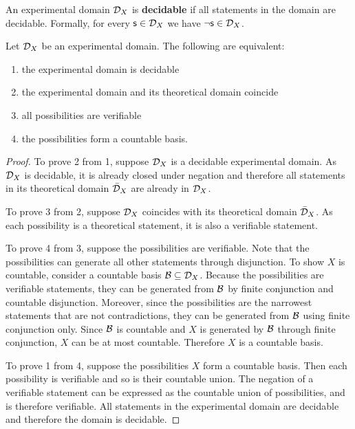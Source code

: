 \documentclass[11pt,letterpaper,fleqn]{memoir} %
\begin{document}
\begin{mathSection}
\begin{defn}
	An experimental domain $\mathcal{D}_X$ is \textbf{decidable} if all statements in the domain are decidable. Formally, for every $\mathsf{s} \in \mathcal{D}_X$ we have $\neg\mathsf{s} \in \mathcal{D}_X$.
\end{defn}

\begin{prop}\label{1_prop_decidable_domain_properties}
	Let $\mathcal{D}_X$ be an experimental domain. The following are equivalent:
	\begin{enumerate}
		\item the experimental domain is decidable
		\item the experimental domain and its theoretical domain coincide
		\item all possibilities are verifiable
		\item the possibilities form a countable basis.
	\end{enumerate}
\end{prop}

\begin{proof}
	To prove 2 from 1, suppose $\mathcal{D}_X$ is a decidable experimental domain. As $\mathcal{D}_X$ is decidable, it is already closed under negation and therefore all statements in its theoretical domain $\bar{\mathcal{D}}_X$ are already in $\mathcal{D}_X$.
	
	To prove 3 from 2, suppose $\mathcal{D}_X$ coincides with its theoretical domain $\bar{\mathcal{D}}_X$. As each possibility is a theoretical statement, it is also a verifiable statement.
	
	To prove 4 from 3, suppose the possibilities are verifiable. Note that the possibilities can generate all other statements through disjunction. To show $X$ is countable, consider a countable basis $\mathcal{B} \subseteq \mathcal{D}_X$. Because the possibilities are verifiable statements, they can be generated from $\mathcal{B}$ by finite conjunction and countable disjunction. Moreover, since the possibilities are the narrowest statements that are not contradictions, they can be generated from $\mathcal{B}$ using finite conjunction only. Since $\mathcal{B}$ is countable and $X$ is generated by $\mathcal{B}$ through finite conjunction, $X$ can be at most countable. Therefore $X$ is a countable basis.
	
	To prove 1 from 4, suppose the possibilities $X$ form a countable basis. Then each possibility is verifiable and so is their countable union. The negation of a verifiable statement can be expressed as the countable union of possibilities, and is therefore verifiable. All statements in the experimental domain are decidable and therefore the domain is decidable.
\end{proof}
\end{mathSection}
\end{document}
